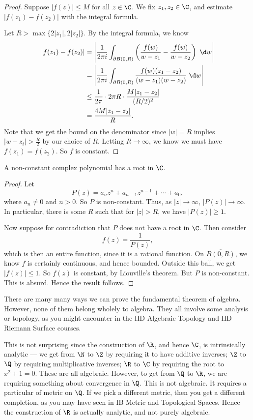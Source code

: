 \documentclass[a4paper]{article}
\begin{document}
\begin{proof}
  Suppose $|f(z)| \leq M$ for all $z \in \C$. We fix $z_1, z_2 \in \C$, and estimate $|f(z_1) - f(z_2)|$ with the integral formula.

  Let $R > \max \{2 |z_1|, 2|z_2|\}$. By the integral formula, we know
  \begin{align*}
    |f(z_1) - f(z_2)| &= \left|\frac{1}{2\pi i}\int_{\partial B(0, R)} \left(\frac{f(w)}{w - z_1} - \frac{f(w)}{w - z_2}\right)\;\d w\right|\\
    &= \left|\frac{1}{2\pi i}\int_{\partial B(0, R)} \frac{f(w)(z_1 - z_2)}{(w - z_1)(w - z_2)} \;\d w\right|\\
    &\leq \frac{1}{2\pi} \cdot 2\pi R \cdot \frac{M |z_1 - z_2|}{(R/2)^2} \\
    &= \frac{4M|z_1 - z_2|}{R}.
  \end{align*}
  Note that we get the bound on the denominator since $|w| = R$ implies $|w - z_i| > \frac{R}{2}$ by our choice of $R$. Letting $R \to \infty$, we know we must have $f(z_1) = f(z_2)$. So $f$ is constant.
\end{proof}

\begin{cor}
  A non-constant complex polynomial has a root in $\C$.
\end{cor}

\begin{proof}
  Let
  \[
    P(z) = a_n z^n + a_{n - 1}z^{n - 1} + \cdots + a_0,
  \]
  where $a_n \not= 0$ and $n > 0$. So $P$ is non-constant. Thus, as $|z| \to \infty$, $|P(z)| \to \infty$. In particular, there is some $R$ such that for $|z| > R$, we have $|P(z)| \geq 1$.

  Now suppose for contradiction that $P$ does not have a root in $\C$. Then consider
  \[
    f(z) = \frac{1}{P(z)},
  \]
  which is then an entire function, since it is a rational function. On $\overline{B(0, R)}$, we know $f$ is certainly continuous, and hence bounded. Outside this ball, we get $|f(z)| \leq 1$. So $f(z)$ is constant, by Liouville's theorem. But $P$ is non-constant. This is absurd. Hence the result follows.
\end{proof}
There are many many ways we can prove the fundamental theorem of algebra. However, none of them belong wholely to algebra. They all involve some analysis or topology, as you might encounter in the IID Algebraic Topology and IID Riemann Surface courses.

This is not surprising since the construction of $\R$, and hence $\C$, is intrinsically analytic --- we get from $\N$ to $\Z$ by requiring it to have additive inverses; $\Z$ to $\Q$ by requiring multiplicative inverses; $\R$ to $\C$ by requiring the root to $x^2 + 1 = 0$. These are all algebraic. However, to get from $\Q$ to $\R$, we are requiring something about convergence in $\Q$. This is not algebraic. It requires a particular of metric on $\Q$. If we pick a different metric, then you get a different completion, as you may have seen in IB Metric and Topological Spaces. Hence the construction of $\R$ is actually analytic, and not purely algebraic.
\end{document}
